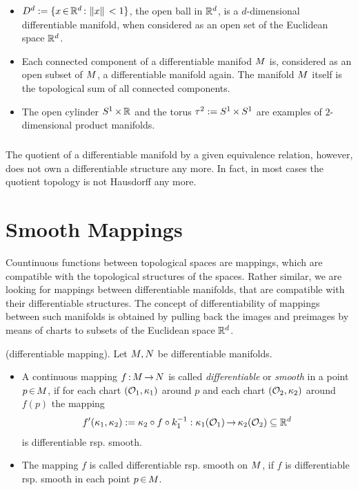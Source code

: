 \documentclass[11pt,twoside]{article}
\begin{document}
\begin{itemize}[leftmargin=15pt]
\item[1.]
$D^d := \{x {\,\in\,} {\mathbb{R}}^d {\,:\,} \left\lVert x \right\rVert \, < 1\}$,
the open ball in ${\mathbb{R}}^d$,
is a $d$-dimensional differentiable manifold,
when considered as an open set of the Euclidean space ${\mathbb{R}}^d$.

\item[2.]
Each connected component of a differentiable manifod ${M}$ is,
considered as an open subset of ${M}$,
a differentiable manifold again.
The manifold ${M}$ itself is the topological sum of all connected components.

\item[3.]
The open cylinder $S^1 {\,\times\,} {\mathbb{R}}$ and the torus $\tau^2 := S^1 {\,\times\,} S^1$
are examples of $2$-dimensional product manifolds.
\end{itemize}

\subparagraph{}
The quotient of a differentiable manifold by a given equivalence relation,
however,
does not own a differentiable structure any more.
In fact,
in most cases the quotient topology is not Hausdorff any more.

\section{Smooth Mappings}
Countinuous functions between topological spaces are mappings,
which are compatible with the topological structures of the spaces.
Rather similar,
we are looking for mappings between differentiable manifolds,
that are compatible with their differentiable structures.
The concept of differentiability of mappings between such manifolds
is obtained by pulling back the images and preimages by means of charts
to subsets of the Euclidean space ${\mathbb{R}}^d$.

\begin{definition}
(differentiable mapping).
Let ${M},{N}$ be differentiable manifolds.

\begin{itemize}[leftmargin=15pt]
\item[1.]
A continuous mapping $f{\,:\,} {M} {\,\to\,} {N}$ is called
\textit{differentiable} or \textit{smooth} in a point $p {\,\in\,} {M}$,
if for each chart $(\mathcal{O}_1,\kappa_1)$ around $p$
and each chart $(\mathcal{O}_2,\kappa_2)$ around $f(p)$ the mapping
\[
f'(\kappa_1,\kappa_2) := \kappa_2 \circ f \circ k_1^{-1}:
\kappa_1(\mathcal{O}_1) {\,\to\,} \kappa_2(\mathcal{O}_2) \subseteq {\mathbb{R}}^d
\]
is differentiable rsp. smooth.
\item[2.]
The mapping $f$ is called differentiable rsp. smooth on ${M}$,
if $f$ is differentiable rsp. smooth in each point $p {\,\in\,} {M}$.
\end{itemize}
\end{definition}
\end{document}
